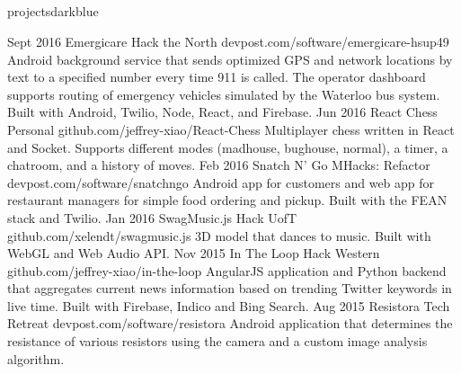 \documentclass{resume}
\begin{document}
\begin{main}
		\section{\faFolder}{projects}{darkblue}
			\begin{entrylist}
				\rightentry%
					{Sept 2016}%
					{Emergicare}%
					{Hack the North}%
					{devpost.com/software/emergicare-hsup49}%
					{Android background service that sends optimized GPS and network locations by text to a specified number every time 911 is called. The operator dashboard supports routing of emergency vehicles simulated by the Waterloo bus system. Built with Android, Twilio, Node, React, and Firebase.}
				\rightentry%
					{Jun 2016}%
					{React Chess}%
					{Personal}%
					{github.com/jeffrey-xiao/React-Chess}%
					{Multiplayer chess written in React and Socket. Supports different modes (madhouse, bughouse, normal), a timer, a chatroom, and a history of moves.}
				\rightentry%
					{Feb 2016}%
					{Snatch N' Go}%
					{MHacks: Refactor}%
					{devpost.com/software/snatchngo}%
					{Android app for customers and web app for restaurant managers for simple food ordering and pickup. Built with the FEAN stack and Twilio.}
				\rightentry%
					{Jan 2016}%
					{SwagMusic.js}%
					{Hack UofT}%
					{github.com/xelendt/swagmusic.js}%
					{3D model that dances to music. Built with WebGL and Web Audio API.}
				\rightentry%
					{Nov 2015}%
					{In The Loop}%
					{Hack Western}%
					{github.com/jeffrey-xiao/in-the-loop}%
					{AngularJS application and Python backend that aggregates current news information based on trending Twitter keywords in live time. Built with Firebase, Indico and Bing Search.}
				\rightentry%
					{Aug 2015}%
					{Resistora}%
					{Tech Retreat}%
					{devpost.com/software/resistora}%
					{Android application that determines the resistance of various resistors using the camera and a custom image analysis algorithm.}
			\end{entrylist}	
	\end{main}
\end{document}
